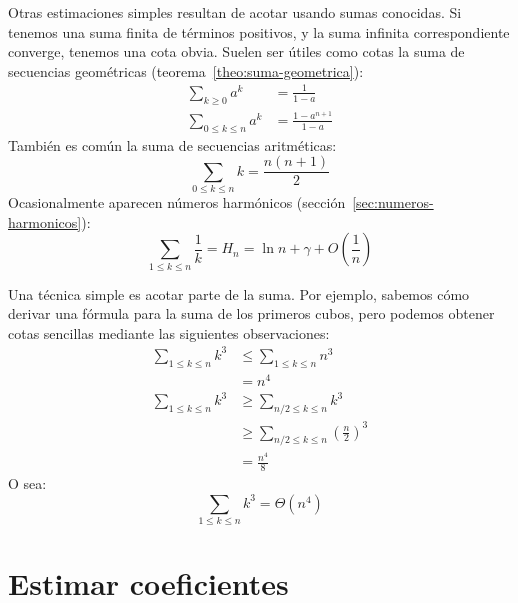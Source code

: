   Otras estimaciones simples resultan de acotar usando sumas conocidas.
  Si tenemos una suma finita de términos positivos,
  y la suma infinita correspondiente converge,
  tenemos una cota obvia.
  Suelen ser útiles como cotas
  la suma de secuencias geométricas
  (teorema~\ref{theo:suma-geometrica}):
  \begin{align}
    \sum_{k \ge 0} a^k
      &= \frac{1}{1 - a} \label{eq:suma-geometrica} \\
    \sum_{0 \le k \le n} a^k
      &= \frac{1 - a^{n + 1}}{1 - a} \label{eq:suma-geometrica-finita}
  \end{align}
  También es común la suma de secuencias aritméticas:%
  \begin{equation}
    \label{eq:suma-aritmetica}
    \sum_{0 \le k \le n} k
      = \frac{n (n + 1)}{2}
  \end{equation}
  Ocasionalmente aparecen números harmónicos
  (sección~\ref{sec:numeros-harmonicos}):%
  \begin{equation}
    \label{eq:3}
    \sum_{1 \le k \le n} \frac{1}{k}
      = H_n
      = \ln n + \gamma + O\left( \frac{1}{n} \right)
  \end{equation}

  Una técnica simple es acotar parte de la suma.
  Por ejemplo,
  sabemos cómo derivar una fórmula para la suma de los primeros cubos,
  pero podemos obtener cotas sencillas mediante las siguientes observaciones:
  \begin{align*}
    \sum_{1 \le k \le n} k^3
      &\le \sum_{1 \le k \le n} n^3 \\
      &=   n^4 \\
    \sum_{1 \le k \le n} k^3
      &\ge \sum_{n / 2 \le k \le n} k^3 \\
      &\ge \sum_{n / 2 \le k \le n} \left( \frac{n}{2} \right)^3 \\
      &=   \frac{n^4}{8}
  \end{align*}
  O sea:
  \begin{equation*}
    \sum_{1 \le k \le n} k^3
      = \Theta(n^4)
  \end{equation*}

\section{Estimar coeficientes}
\label{sec:estimar-coeficientes}

